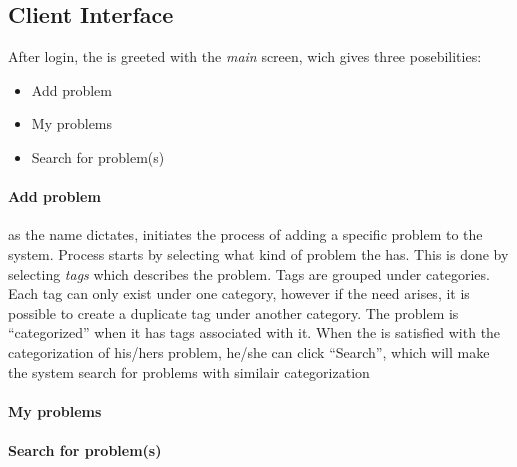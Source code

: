 \subsection{Client Interface}
\label{sec:client_interface}

After login, the \aclient[] is greeted with the \textit{main} screen, wich gives three posebilities:
\begin{itemize}
	\item Add problem
	\item My problems
	\item Search for problem(s)
\end{itemize}

\paragraph{Add problem} as the name dictates, initiates the process of adding a specific problem to the system. Process starts by selecting what kind of problem the \aclient[] has. This is done by selecting \textit{tags} which describes the problem. Tags are grouped under categories. Each tag can only exist under one category, however if the need arises, it is possible to create a duplicate tag under another category. The problem is ``categorized'' when it has tags associated with it.
When the \aclient[] is satisfied with the categorization of his/hers problem, he/she can click ``Search'', which will make the system search for problems with similair categorization
\paragraph{My problems}
\paragraph{Search for problem(s)}



